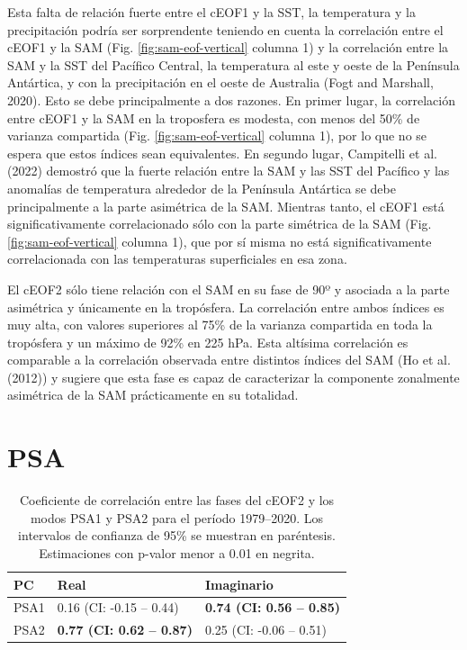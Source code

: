 \documentclass[12pt,oneside]{reedthesis}
\begin{document}
Esta falta de relación fuerte entre el cEOF1 y la SST, la temperatura y la precipitación podría ser sorprendente teniendo en cuenta la correlación entre el cEOF1 y la SAM (Fig. \ref{fig:sam-eof-vertical} columna 1) y la correlación entre la SAM y la SST del Pacífico Central, la temperatura al este y oeste de la Península Antártica, y con la precipitación en el oeste de Australia (Fogt and Marshall, 2020).
Esto se debe principalmente a dos razones.
En primer lugar, la correlación entre cEOF1 y la SAM en la troposfera es modesta, con menos del 50\% de varianza compartida (Fig. \ref{fig:sam-eof-vertical} columna 1), por lo que no se espera que estos índices sean equivalentes.
En segundo lugar, Campitelli et al. (2022) demostró que la fuerte relación entre la SAM y las SST del Pacífico y las anomalías de temperatura alrededor de la Península Antártica se debe principalmente a la parte asimétrica de la SAM.
Mientras tanto, el cEOF1 está significativamente correlacionado sólo con la parte simétrica de la SAM (Fig. \ref{fig:sam-eof-vertical} columna 1), que por sí misma no está significativamente correlacionada con las temperaturas superficiales en esa zona.

El cEOF2 sólo tiene relación con el SAM en su fase de 90º y asociada a la parte asimétrica y únicamente en la tropósfera.
La correlación entre ambos índices es muy alta, con valores superiores al 75\% de la varianza compartida en toda la tropósfera y un máximo de 92\% en 225 hPa.
Esta altísima correlación es comparable a la correlación observada entre distintos índices del SAM (Ho et al. (2012)) y sugiere que esta fase es capaz de caracterizar la componente zonalmente asimétrica de la SAM prácticamente en su totalidad.

\hypertarget{psa}{%
\section{PSA}\label{psa}}





\begin{table}

\caption{\label{tab:psa-eof2}Coeficiente de correlación entre las fases del cEOF2 y los modos PSA1 y PSA2 para el período 1979--2020.
Los intervalos de confianza de 95\% se muestran en paréntesis.
Estimaciones con p-valor menor a 0.01 en negrita.}
\centering
\begin{tabular}[t]{l>{}l>{}l}
\toprule
PC & Real & Imaginario\\
\midrule
PSA1 & 0.16 (CI: -0.15 -- 0.44) & \textbf{0.74 (CI: 0.56 -- 0.85)}\\
\cmidrule{1-3}
PSA2 & \textbf{0.77 (CI: 0.62 -- 0.87)} & 0.25 (CI: -0.06 -- 0.51)\\
\bottomrule
\end{tabular}
\end{table}
\end{document}
